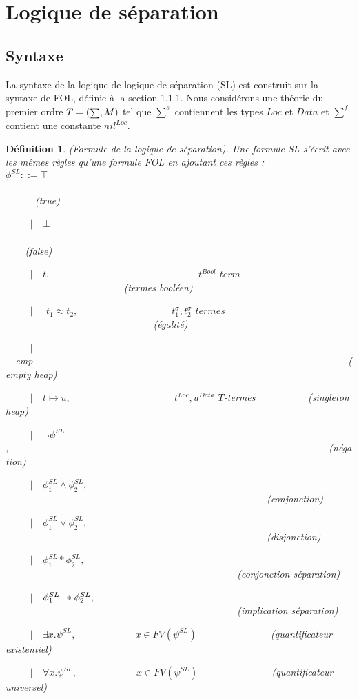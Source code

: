 \documentclass[9pt]{book}
\newcommand\sepimp{\mathrel{-\mkern-6mu*}}
\newtheorem{definition}{D\'efinition}[section]
\begin{document}
	\section{Logique de s\'eparation}
		\subsection{Syntaxe}
	La syntaxe de la logique de logique de s\'eparation (SL) est construit sur la syntaxe de FOL, d\'efinie \`a la section 1.1.1. Nous consid\'erons une th\'eorie du premier ordre $T=(\mathsmaller\sum,M)$ tel que $\sum^{s}$ contiennent les types $Loc$ et $Data$ et $\sum^{f}$ contient une constante $nil^{Loc}$.
	\begin{definition}
	(Formule de la logique de s\'eparation). Une formule SL s'\'ecrit avec les m\^emes r\`egles qu'une formule FOL en ajoutant ces r\`egles :
	\\$\phi^{SL} ::= \top$~~~~~~~~~~~~~~~~~~~~~~~~~~~~~~~~~~~~~~~~~~~~~~~~~~~~~~~~~~~~~~~~~~~~~~~~~~~~(true)\par
~~~~~$|$~~$\bot$~~~~~~~~~~~~~~~~~~~~~~~~~~~~~~~~~~~~~~~~~~~~~~~~~~~~~~~~~~~~~~~~~~~~~~~~~~(false)
\par
~~~~~$|$~~$t,$~~~~~~~~~~~~~~~~~~~~~~~~~~~~~~$t^{Bool}$ $term$~~~~~~~~~~~~~~~~~~~~~~~~(termes bool\'een)\par
~~~~~$|$~~ $t_{1} \approx t_{2},$~~~~~~~~~~~~~~~~~~~$t_{1}^{\sigma},t_{2}^{\sigma}$ $termes$~~~~~~~~~~~~~~~~~~~~~~~~~~~~~~(\'egalit\'e)\par
~~~~~$|$~~emp~~~~~~~~~~~~~~~~~~~~~~~~~~~~~~~~~~~~~~~~~~~~~~~~~~~~~~~~~~~~~~~~(empty heap)\par
~~~~~$|$~~$t\mapsto u,$~~~~~~~~~~~~~~~~~~~~~$t^{Loc},u^{Data}$ $T$-termes ~~~~~~~~~~(singleton heap)\par 
~~~~~$|$~~$\neg\psi^{SL}$,~~~~~~~~~~~~~~~~~~~~~~~~~~~~~~~~~~~~~~~~~~~~~~~~~~~~~~~~~~~~~~~~~(n\'egation)\par
~~~~~$|$~~$\phi_{1}^{SL} \land \phi_{2}^{SL},$~~~~~~~~~~~~~~~~~~~~~~~~~~~~~~~~~~~~~~~~~~~~~~~~~~~~~(conjonction)\par
~~~~~$|$~~$\phi_{1}^{SL} \lor \phi_{2}^{SL},$~~~~~~~~~~~~~~~~~~~~~~~~~~~~~~~~~~~~~~~~~~~~~~~~~~~~~(disjonction)\par
~~~~~$|$~~$\phi_{1}^{SL} * \phi_{2}^{SL},$~~~~~~~~~~~~~~~~~~~~~~~~~~~~~~~~~~~~~~~~~~~~~~~(conjonction s\'eparation)\par
~~~~~$|$~~$\phi_{1}^{SL} \sepimp \phi_{2}^{SL},$~~~~~~~~~~~~~~~~~~~~~~~~~~~~~~~~~~~~~~~~~~~~~~~(implication s\'eparation)\par
~~~~~$|$~~$\exists x.\psi^{SL},$~~~~~~~~~~~~$x\in FV(\psi^{SL})$~~~~~~~~~~~~~~~(quantificateur existentiel)\par
~~~~~$|$~~$\forall x.\psi^{SL},$~~~~~~~~~~~~$x\in FV(\psi^{SL})$~~~~~~~~~~~~~~~(quantificateur universel)
	\end{definition}
\end{document}
